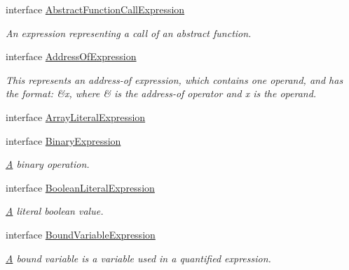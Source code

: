 \begin{DoxyCompactItemize}
\item 
interface \hyperlink{interfaceedu_1_1udel_1_1cis_1_1vsl_1_1civl_1_1model_1_1IF_1_1expression_1_1AbstractFunctionCallExpression}{Abstract\+Function\+Call\+Expression}
\begin{DoxyCompactList}\small\item\em An expression representing a call of an abstract function. \end{DoxyCompactList}\item 
interface \hyperlink{interfaceedu_1_1udel_1_1cis_1_1vsl_1_1civl_1_1model_1_1IF_1_1expression_1_1AddressOfExpression}{Address\+Of\+Expression}
\begin{DoxyCompactList}\small\item\em This represents an address-\/of expression, which contains one operand, and has the format\+: {\ttfamily \&x}, where {\ttfamily \&} is the address-\/of operator and {\ttfamily x} is the operand. \end{DoxyCompactList}\item 
interface \hyperlink{interfaceedu_1_1udel_1_1cis_1_1vsl_1_1civl_1_1model_1_1IF_1_1expression_1_1ArrayLiteralExpression}{Array\+Literal\+Expression}
\item 
interface \hyperlink{interfaceedu_1_1udel_1_1cis_1_1vsl_1_1civl_1_1model_1_1IF_1_1expression_1_1BinaryExpression}{Binary\+Expression}
\begin{DoxyCompactList}\small\item\em \hyperlink{structA}{A} binary operation. \end{DoxyCompactList}\item 
interface \hyperlink{interfaceedu_1_1udel_1_1cis_1_1vsl_1_1civl_1_1model_1_1IF_1_1expression_1_1BooleanLiteralExpression}{Boolean\+Literal\+Expression}
\begin{DoxyCompactList}\small\item\em \hyperlink{structA}{A} literal boolean value. \end{DoxyCompactList}\item 
interface \hyperlink{interfaceedu_1_1udel_1_1cis_1_1vsl_1_1civl_1_1model_1_1IF_1_1expression_1_1BoundVariableExpression}{Bound\+Variable\+Expression}
\begin{DoxyCompactList}\small\item\em \hyperlink{structA}{A} bound variable is a variable used in a quantified expression. \end{DoxyCompactList}\item 

\end{DoxyCompactItemize}
